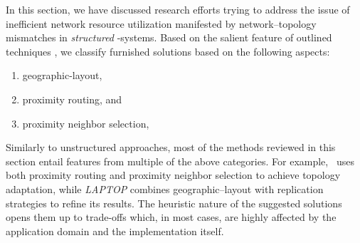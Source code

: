 
In this section, we have discussed research efforts 
trying to address the issue of inefficient network resource utilization 
manifested by network--topology mismatches in \emph{structured} \p-systems.
Based on the salient feature of outlined techniques
\cite{CDHR2002,CDCR2002,RSS2002}, we classify furnished solutions 
based on the following aspects:
\begin{enumerate}
  \item geographic-layout,
  \item proximity routing, and 
  \item proximity neighbor selection,
\end{enumerate}
Similarly to unstructured approaches, most of the methods
reviewed in this section entail features from multiple of the above categories. 
For example, \cite{KLKP2008}~uses both proximity routing 
and proximity neighbor selection to achieve topology adaptation,
while \emph{LAPTOP} combines geographic--layout with
replication strategies to refine its results.
The heuristic nature of the suggested solutions opens them up 
to trade-offs which, in most cases, are 
highly affected by the application domain and the implementation itself.

